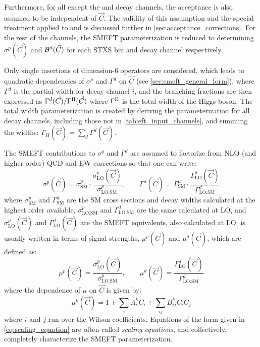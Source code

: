 Furthermore, for all except the \Hfl and \Hlnulnu decay channels, the acceptance is also assumed to be independent of $\vec{C}$. The validity of this assumption and the special treatment applied to \Hfl and \Hlnulnu is discussed further in \cref{sec:acceptance_corrections}. For the rest of the channels, the SMEFT parameterization is reduced to determining $\sigma^p(\vec{C})$ and $\mathcal{B}^d(\vec{C})$ for each STXS bin and decay channel respectively. 

Only single insertions of dimension-6 operators are considered, which leads to quadratic dependencies of $\sigma^p$ and $\Gamma^d$ on $\vec{C}$ (see \cref{sec:smeft_general_form}), where $\Gamma^d$ is the partial width for decay channel $i$, and the branching fractions are then expressed as $\Gamma^d(\vec{C}) / \Gamma^\mathrm{H}(\vec{C})$ where $\Gamma^\mathrm{H}$ is the total width of the Higgs boson. The total width parameterization is created by deriving the parameterization for all decay channels, including those not in \cref{tab:eft_input_channels}, and summing the widths: $\Gamma_H(\vec{C}) = \sum_d \Gamma^d(\vec{C})$. 

The SMEFT contributions to $\sigma^p$ and $\Gamma^d$ are assumed to factorize from NLO (and higher order) QCD and EW corrections so that one can write:
\begin{equation}
  \sigma^p(\vec{C}) = \sigma^p_{\text{SM}} \cdot \frac{\sigma^p_{\text{LO}}(\vec{C})}{\sigma^p_{\text{LO,SM}}}, \quad\quad \Gamma^d(\vec{C}) = \Gamma^d_{\text{SM}} \cdot \frac{\Gamma^d_{\text{LO}}(\vec{C})}{\Gamma^d_{\text{LO,SM}}}
  \label{eq:eft_nlo_lo_factorization}
\end{equation} 
where $\sigma^p_{\text{SM}}$ and $\Gamma^d_{\text{SM}}$ are the SM cross sections and decay widths calculated at the highest order available, $\sigma^p_{\text{LO,SM}}$ and $\Gamma^d_{\text{LO,SM}}$ are the same calculated at LO, and $\sigma^p_{\text{LO}}(\vec{C})$ and $\Gamma^d_{\text{LO}}(\vec{C})$ are the SMEFT equivalents, also calculated at LO.  is usually written in terms of signal strengths, $\mu^p(\vec{C})$ and $\mu^d(\vec{C})$, which are defined as:
\begin{equation}
  \mu^p(\vec{C}) = \frac{\sigma^p_{\text{LO}}(\vec{C})}{\sigma^p_{\text{LO,SM}}}, \quad\quad \mu^d(\vec{C}) = \frac{\Gamma^d_{\text{LO}}(\vec{C})}{\Gamma^d_{\text{LO,SM}}}
\end{equation}
where the dependence of $\mu$ on $\vec{C}$ is given by:
\begin{equation}
  \mu^k(\vec{C}) = 1 + \sum_i A_i^k C_i + \sum_{ij} B_{ij}^k C_i C_j
  \label{eq:scaling_equation}
\end{equation}
where $i$ and $j$ run over the Wilson coefficients. Equations of the form given in \cref{eq:scaling_equation} are often called \textit{scaling equations}, and collectively, completely characterize the SMEFT parameterization. 

